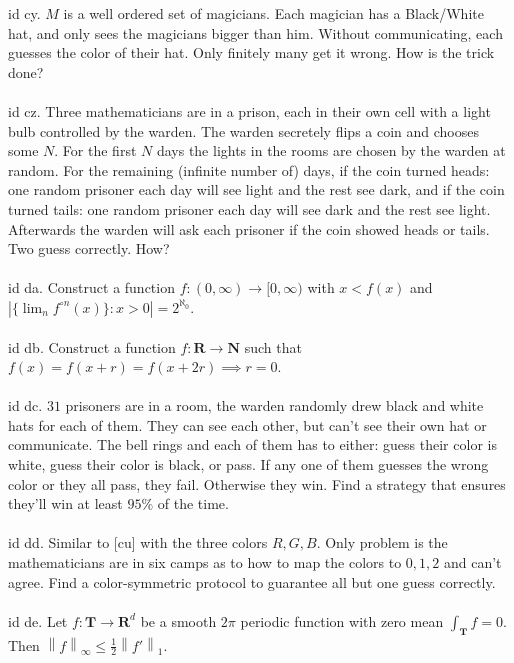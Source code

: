 \documentclass[oneside]{book}
\newcommand{\N}{\mathbf{N}}
\newcommand{\R}{\mathbf{R}}
\newcommand{\T}{\mathbf{T}}
\newcommand{\set}[1]{\{ #1\}}
\newcommand{\abs}[1]{\left\lvert #1\right\rvert}
\newcommand{\norm}[1]{\left\lVert #1\right\rVert}
\begin{document}
id cy. $M$ is a well ordered set of magicians. Each magician has a Black/White hat, and only sees the magicians bigger than him. Without communicating, each guesses the color of their hat. Only finitely many get it wrong. How is the trick done?\\\\


id cz. Three mathematicians are in a prison, each in their own cell with a light bulb controlled by the warden. The warden secretely flips a coin and chooses some $N$. For the first $N$ days the lights in the rooms are chosen by the warden at random. For the remaining (infinite number of) days, if the coin turned heads: one random prisoner each day will see light and the rest see dark, and if the coin turned tails: one random prisoner each day will see dark and the rest see light. Afterwards the warden will ask each prisoner if the coin showed heads or tails. Two guess correctly. How?\\\\


id da. Construct a function $f:(0,\infty)\to [0,\infty)$ with $x<f(x)$ and $\abs{\set{\lim_n f^{\circ n}(x)}: x>0}=2^{\aleph_0}$.\\\\


id db. Construct a function $f:\R\to\N$ such that $f(x)=f(x+r)=f(x+2r)\implies r=0$.\\\\


id dc. $31$ prisoners are in a room, the warden randomly drew black and white hats for each of them. They can see each other, but can't see their own hat or communicate. The bell rings and each of them has to either: guess their color is white, guess their color is black, or pass. If any one of them guesses the wrong color or they all pass, they fail. Otherwise they win. Find a strategy that ensures they'll win at least $95\%$ of the time.\\\\


id dd. Similar to [cu] with the three colors $R,G,B$. Only problem is the mathematicians are in six camps as to how to map the colors to $0,1,2$ and can't agree. Find a color-symmetric protocol to guarantee all but one guess correctly.\\\\


id de. Let $f:\T\to\R^d$ be a smooth $2\pi$ periodic function with zero mean $\int_\T f=0$. Then $\norm{f}_\infty\le \frac{1}{2}\norm{f'}_{1}$.\\\\
\end{document}
